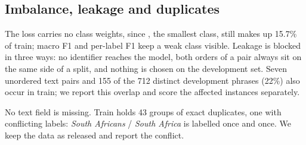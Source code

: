 \subsection{Imbalance, leakage and duplicates}

The loss carries no class weights, since \NO{}, the smallest class, still makes up 15.7\% of train; macro F1 and per-label F1 keep a weak class visible. Leakage is blocked in three ways: no identifier reaches the model, both orders of a pair always sit on the same side of a split, and nothing is chosen on the development set. Seven unordered text pairs and 155 of the 712 distinct development phrases (22\%) also occur in train; we report this overlap and score the affected instances separately.

No text field is missing. Train holds 43 groups of exact duplicates, one with conflicting labels: \emph{South Africans} / \emph{South Africa} is labelled \FW{} once and \NO{} once. We keep the data as released and report the conflict.
